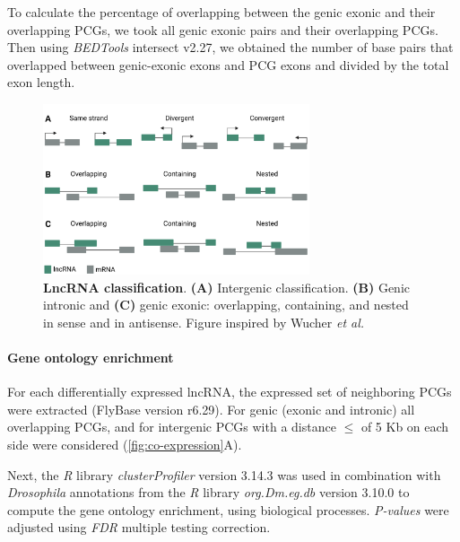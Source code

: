 To calculate the percentage of overlapping between the genic exonic and their overlapping PCGs, we took all genic exonic pairs and their overlapping PCGs. Then using \textit{BEDTools} \autocite{quinlan_2010_bedtools} intersect v2.27, we obtained the number of base pairs that overlapped between genic-exonic exons and PCG exons and divided by the total exon length.

\begin{figure}[!htb]
  \centering
  \includegraphics[width=0.7\textwidth]{img/methods/regeneration/lncRNA_class_methods.png}
  \caption[LncRNA classification]{\textbf{LncRNA classification}. \textbf{(A)} Intergenic classification. \textbf{(B)} Genic intronic and \textbf{(C)} genic exonic: overlapping, containing, and nested in sense and in antisense. Figure inspired by Wucher \textit{et al.}\autocite{wucher_2017}}
  \label{fig:lncRNA-class}
\end{figure}

\paragraph{Gene ontology enrichment}
\label{sec:gene_ontology_enrichment}

For each differentially expressed lncRNA, the expressed set of neighboring PCGs were extracted (FlyBase version r6.29). For genic (exonic and intronic) all overlapping PCGs, and for intergenic PCGs with a distance $\leq$ of 5 Kb on each side were considered (\autoref{fig:co-expression}A).

Next, the \textit{R} library \textit{clusterProfiler} \autocite{yu_2012} version 3.14.3 was used in combination with \textit{Drosophila} annotations from the \textit{R} library \textit{org.Dm.eg.db} \autocite{carlson_2013} version 3.10.0 to compute the gene ontology enrichment, using biological processes. \textit{P-values} were adjusted using \textit{FDR} multiple testing correction.

